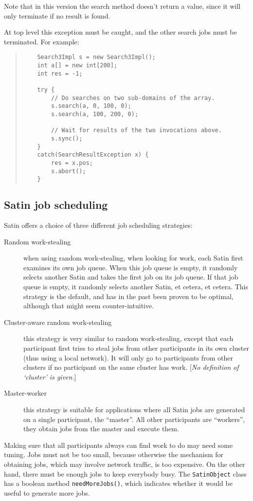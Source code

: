 \documentclass[10pt]{article}
\newcommand{\mysubsection}[1]{\subsection{#1}\label{#1}}
\newcommand{\remark}[1]{[\emph{#1}]}
\begin{document}
Note that in this version the search method doesn't return a value,
since it will only terminate if no result is found.

At top level this exception must be caught, and the other search
jobs must be terminated. For example:

\begin{quote}
\begin{verbatim}
    Search3Impl s = new Search3Impl();
    int a[] = new int[200];
    int res = -1;

    try {
        // Do searches on two sub-domains of the array.
        s.search(a, 0, 100, 0);
        s.search(a, 100, 200, 0);

        // Wait for results of the two invocations above.
        s.sync();
    }
    catch(SearchResultException x) {
        res = x.pos;
        s.abort();
    }
\end{verbatim}
\end{quote}

\mysubsection{Satin job scheduling}

Satin offers a choice of three different job scheduling strategies:
\begin{description}
\item[Random work-stealing]
when using random work-stealing, when looking for work, each Satin
first examines its own job queue. When this job queue is empty,
it randomly selects another Satin and takes the first job on its job queue.
If that job queue is empty, it randomly selects another Satin, et cetera,
et cetera.  This strategy is the default, and has in the past been proven
to be optimal, although that might seem counter-intuitive.
\item[Cluster-aware random work-stealing]
this strategy is very similar to random work-stealing, except that
each participant first tries to steal jobs from other participants in its
own cluster (thus using a local network). It will only go to participants
from other clusters if no participant on the same cluster has work.
\remark{No definition of `cluster' is given.}
\item[Master-worker]
this strategy is suitable for applications where all Satin jobs are
generated on a single participant, the ``master''. All other participants
are ``workers'', they obtain jobs from the master and execute them.
\end{description}

Making sure that all participants always can find work to do may need
some tuning. Jobs must not be too small, because otherwise the mechanism
for obtaining jobs, which may involve network traffic, is too expensive.
On the other hand, there must be enough jobs to keep everybody busy.
The \verb+SatinObject+ class has a boolean method \verb+needMoreJobs()+,
which indicates whether it would be useful to generate more jobs.
\end{document}
